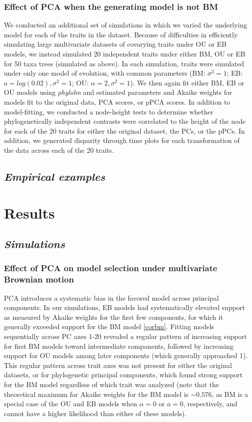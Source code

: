 \documentclass[a4paper,12pt]{article}
\begin{document}
\subsubsection{Effect of PCA when the generating model is not BM}
We conducted an additional set of simulations in which we varied the underlying model for each of the traits in the dataset. Because of difficulties in efficiently simulating large multivariate datasets of covarying traits under OU or EB models, we instead simulated 20 independent traits under either BM, OU or EB for 50 taxa trees (simulated as above). In each simulation, traits were simulated under only one model of evolution, with common parameters (BM: $\sigma^2 = 1$; EB: $a = log(0.02), \sigma^2 = 1$; OU: $\alpha=2, \sigma^2 = 1$). We then again fit either BM, EB or OU models using \textit{phylolm} and estimated parameters and Akaike weights for models fit to the original data, PCA scores, or pPCA scores. In addition to model-fitting, we conducted a node-height tests to determine whether phylogenetically independent contrasts were correlated to the height of the node for each of the 20 traits for either the original dataset, the PCs, or the pPCs. In addition, we generated disparity through time plots for each transformation of the data across each of the 20 traits. 

\subsection{\emph{Empirical examples}}


\section{Results}
\subsection{\emph{Simulations}}
\subsubsection{Effect of PCA on model selection under multivariate Brownian motion}
PCA introduces a systematic bias in the favored model across principal components. In our simulations, EB models had systematically elevated support as measured by Akaike weights for the first few components, for which it generally exceeded support for the BM model \ref{corbm}. Fitting models sequentially across PC axes 1-20 revealed a regular pattern of increasing support for first BM models toward intermediate components, followed by increasing support for OU models among later components (which generally approached 1). This regular pattern across trait axes was not present for either the original datasets, or for phylogenetic principal components, which found strong support for the BM model regardless of which trait was analyzed (note that the theoretical maximum for Akaike weights for the BM model is $\sim 0.576$, as BM is a special case of the OU and EB models when $\alpha=0$ or $a = 0$, respectively, and cannot have a higher likelihood than either of these models).   
\end{document}
